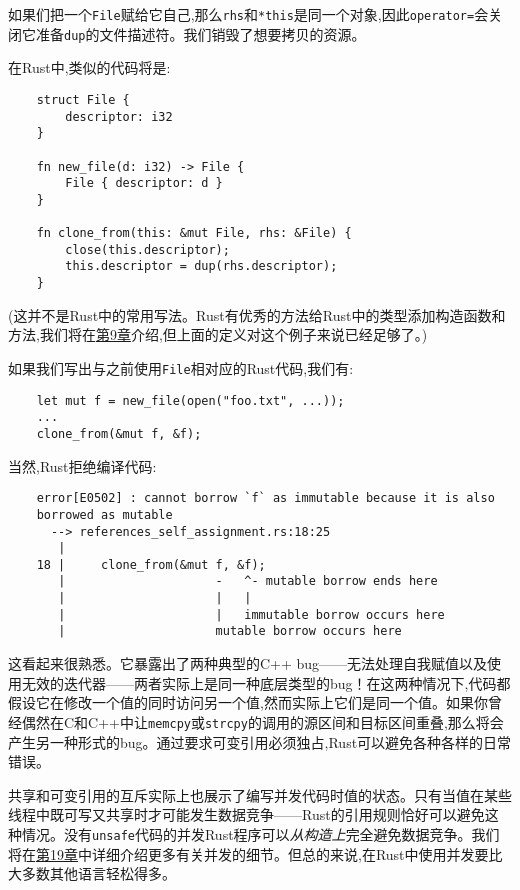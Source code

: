 如果们把一个\texttt{File}赋给它自己,那么\texttt{rhs}和\texttt{*this}是同一个对象,因此\texttt{operator=}会关闭它准备\texttt{dup}的文件描述符。我们销毁了想要拷贝的资源。

在Rust中,类似的代码将是:
\begin{verbatim}
    struct File {
        descriptor: i32
    }

    fn new_file(d: i32) -> File {
        File { descriptor: d }
    }

    fn clone_from(this: &mut File, rhs: &File) {
        close(this.descriptor);
        this.descriptor = dup(rhs.descriptor);
    }
\end{verbatim}
(这并不是Rust中的常用写法。Rust有优秀的方法给Rust中的类型添加构造函数和方法,我们将在\hyperref[ch09]{第9章}介绍,但上面的定义对这个例子来说已经足够了。)

如果我们写出与之前使用\texttt{File}相对应的Rust代码,我们有:
\begin{verbatim}
    let mut f = new_file(open("foo.txt", ...));
    ...
    clone_from(&mut f, &f);
\end{verbatim}

当然,Rust拒绝编译代码:
\begin{verbatim}
    error[E0502] : cannot borrow `f` as immutable because it is also 
    borrowed as mutable 
      --> references_self_assignment.rs:18:25
       |
    18 |     clone_from(&mut f, &f);
       |                     -   ^- mutable borrow ends here 
       |                     |   |
       |                     |   immutable borrow occurs here 
       |                     mutable borrow occurs here
\end{verbatim}

这看起来很熟悉。它暴露出了两种典型的C++ bug——无法处理自我赋值以及使用无效的迭代器——两者实际上是同一种底层类型的bug！在这两种情况下,代码都假设它在修改一个值的同时访问另一个值,然而实际上它们是同一个值。如果你曾经偶然在C和C++中让\texttt{memcpy}或\texttt{strcpy}的调用的源区间和目标区间重叠,那么将会产生另一种形式的bug。通过要求可变引用必须独占,Rust可以避免各种各样的日常错误。

共享和可变引用的互斥实际上也展示了编写并发代码时值的状态。只有当值在某些线程中既可写又共享时才可能发生数据竞争——Rust的引用规则恰好可以避免这种情况。没有\texttt{unsafe}代码的并发Rust程序可以\emph{从构造上}完全避免数据竞争。我们将在\hyperref[ch19]{第19章}中详细介绍更多有关并发的细节。但总的来说,在Rust中使用并发要比大多数其他语言轻松得多。

\clearpage

